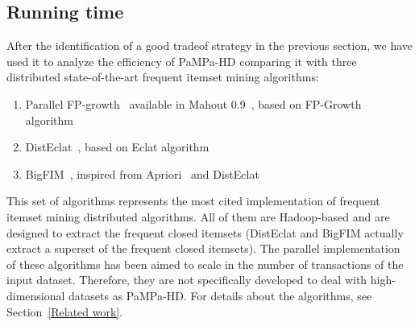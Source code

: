 %
%
%
%


\subsection{Running time}\label{running_time}
After the identification of a good tradeof strategy in the previous section, we have used it to analyze the efficiency of PaMPa-HD
comparing it with three distributed state-of-the-art frequent itemset mining algorithms:
\begin{enumerate}
\item Parallel FP-growth~\cite{pfpgrowth} available in Mahout 0.9~\cite{Mahout}, based on FP-Growth algorithm~\cite{Han00}

\item DistEclat~\cite{bigfim}, based on Eclat algorithm~\cite{Zaki97newalgorithms}
\item BigFIM~\cite{bigfim}, inspired from Apriori~\cite{Agr94} and DistEclat
\end{enumerate}
This set of algorithms represents the most cited implementation of frequent itemset mining distributed algorithms. All of them are Hadoop-based and are designed to extract the frequent closed itemsets (DistEclat and BigFIM actually extract a superset of the frequent closed itemsets).
The parallel implementation of these algorithms has been aimed to scale in the number of transactions of the input dataset. Therefore, they are not specifically developed to deal with
high-dimensional datasets as PaMPa-HD. 
For details about the algorithms, see Section~\ref{Related work}.

